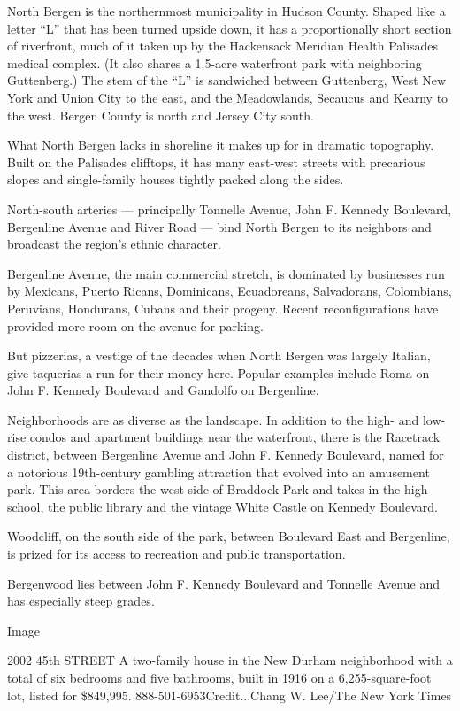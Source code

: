 North Bergen is the northernmost municipality in Hudson County. Shaped
like a letter ``L'' that has been turned upside down, it has a
proportionally short section of riverfront, much of it taken up by the
Hackensack Meridian Health Palisades medical complex. (It also shares a
1.5-acre waterfront park with neighboring Guttenberg.) The stem of the
``L'' is sandwiched between Guttenberg, West New York and Union City to
the east, and the Meadowlands, Secaucus and Kearny to the west. Bergen
County is north and Jersey City south.

What North Bergen lacks in shoreline it makes up for in dramatic
topography. Built on the Palisades clifftops, it has many east-west
streets with precarious slopes and single-family houses tightly packed
along the sides.

North-south arteries --- principally Tonnelle Avenue, John F. Kennedy
Boulevard, Bergenline Avenue and River Road --- bind North Bergen to its
neighbors and broadcast the region's ethnic character.

Bergenline Avenue, the main commercial stretch, is dominated by
businesses run by Mexicans, Puerto Ricans, Dominicans, Ecuadoreans,
Salvadorans, Colombians, Peruvians, Hondurans, Cubans and their progeny.
Recent reconfigurations have provided more room on the avenue for
parking.

But pizzerias, a vestige of the decades when North Bergen was largely
Italian, give taquerias a run for their money here. Popular examples
include Roma on John F. Kennedy Boulevard and Gandolfo on Bergenline.

Neighborhoods are as diverse as the landscape. In addition to the high-
and low-rise condos and apartment buildings near the waterfront, there
is the Racetrack district, between Bergenline Avenue and John F. Kennedy
Boulevard, named for a notorious 19th-century gambling attraction that
evolved into an amusement park. This area borders the west side of
Braddock Park and takes in the high school, the public library and the
vintage White Castle on Kennedy Boulevard.

Woodcliff, on the south side of the park, between Boulevard East and
Bergenline, is prized for its access to recreation and public
transportation.

Bergenwood lies between John F. Kennedy Boulevard and Tonnelle Avenue
and has especially steep grades.

Image

2002 45th STREET \textbar{} A two-family house in the New Durham
neighborhood with a total of six bedrooms and five bathrooms, built in
1916 on a 6,255-square-foot lot, listed for \$849,995.
888-501-6953Credit...Chang W. Lee/The New York Times

